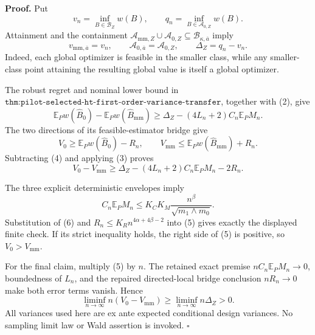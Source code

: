 \textbf{Proof.}
Put
\[
v_n=\inf_{B\in\mathcal B_Z}w(B),
\qquad
q_n=\inf_{B\in\mathcal A_{0,Z}}w(B).
\tag{1}
\]
Attainment and the containment
\(\mathcal A_{\mathrm{mm},Z}\cup\mathcal A_{0,Z}
\subseteq\mathcal B_{\kappa,\overline a}\)
imply
\[
v_{\mathrm{mm},\overline a}=v_n,
\qquad
\mathcal A_{0,\overline a}=\mathcal A_{0,Z},
\qquad
\Delta_Z=q_n-v_n.
\tag{2}
\]
Indeed, each global optimizer is feasible in the smaller class, while any smaller-class point attaining the resulting global value is itself a global optimizer.

The robust regret and nominal lower bound in \(\texttt{thm:pilot-selected-ht-first-order-variance-transfer}\), together with (2), give
\[
\mathbb E_Pw(\widehat B_0)-\mathbb E_Pw(\widehat B_{\mathrm{mm}})
\ge\Delta_Z-(4L_n+2)C_n\mathbb E_PM_n.
\tag{3}
\]
The two directions of its feasible-estimator bridge give
\[
V_0\ge\mathbb E_Pw(\widehat B_0)-R_n,
\qquad
V_{\mathrm{mm}}\le\mathbb E_Pw(\widehat B_{\mathrm{mm}})+R_n.
\tag{4}
\]
Subtracting (4) and applying (3) proves
\[
V_0-V_{\mathrm{mm}}
\ge\Delta_Z-(4L_n+2)C_n\mathbb E_PM_n-2R_n.
\tag{5}
\]

The three explicit deterministic envelopes imply
\[
C_n\mathbb E_PM_n
\le K_CK_M\frac{n^\beta}{\sqrt{m_1\wedge m_0}}.
\tag{6}
\]
Substitution of (6) and \(R_n\le K_Rn^{4\alpha+4\beta-2}\) into (5) gives exactly the displayed finite check.  If its strict inequality holds, the right side of (5) is positive, so \(V_0>V_{\mathrm{mm}}\).

For the final claim, multiply (5) by \(n\).  The retained exact premise \(nC_n\mathbb E_PM_n\to0\), boundedness of \(L_n\), and the repaired directed-local bridge conclusion \(nR_n\to0\) make both error terms vanish.  Hence
\[
\liminf_{n\to\infty}n(V_0-V_{\mathrm{mm}})
\ge\liminf_{n\to\infty}n\Delta_Z>0.
\tag{7}
\]
All variances used here are ex ante expected conditional design variances.  No sampling limit law or Wald assertion is invoked. \(\square\)
